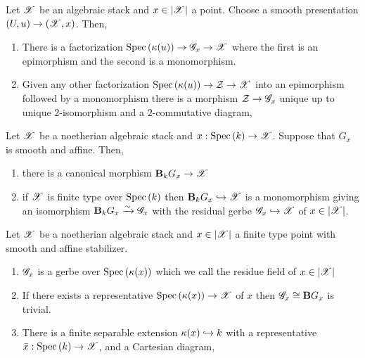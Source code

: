 \documentclass[12pt]{article}
\begin{document}
\begin{prop}
Let $\mathscr{X}$ be an algebraic stack and $x \in |\mathscr{X}|$ a point. Choose a smooth presentation $(U, u) \to (\mathscr{X}, x)$. Then,
\begin{enumerate}
\item There is a factorization $\mathrm{Spec}\left( \kappa(u) \right) \to \mathscr{G}_x \to \mathscr{X}$ where the first is an epimorphism and the second is a monomorphism.
\item Given any other factorization $\mathrm{Spec}\left( \kappa(u) \right) \to \mathcal{Z} \to \mathscr{X}$ into an epimorphism followed by a monomorphism there is a morphism $\mathcal{Z} \to \mathscr{G}_x$ unique up to unique $2$-isomorphism and a $2$-commutative diagram,
\begin{center}
\end{center}
\end{enumerate}
\end{prop}

\begin{prop}
Let $\mathscr{X}$ be a noetherian algebraic stack and $x : \mathrm{Spec}\left( k \right) \to \mathscr{X}$. Suppose that $G_x$ is smooth and affine. Then,
\begin{enumerate}
\item there is a canonical morphism $\mathbf{B}_k G_x \to \mathscr{X}$
\item if $\mathscr{X}$ is finite type over $\mathrm{Spec}\left( k \right)$ then $\mathbf{B}_k G_x \hookrightarrow \mathscr{X}$ is a monomorphism giving an isomorphism $\mathbf{B}_k G_x \xrightarrow{\sim} \mathscr{G}_x$ with the residual gerbe $\mathscr{G}_x \hookrightarrow \mathscr{X}$ of $x \in |\mathscr{X}|$.
\end{enumerate}
\end{prop}

\begin{prop}
Let $\mathscr{X}$ be a noetherian algebraic stack and $x \in |\mathscr{X}|$ a finite type point with smooth and affine stabilizer. 
\begin{enumerate}
\item $\mathscr{G}_x$ is a gerbe over $\mathrm{Spec}\left( \kappa(x) \right)$ which we call the residue field of $x \in |\mathscr{X}|$
\item If there exists a representative $\mathrm{Spec}\left( \kappa(x) \right) \to \mathscr{X}$ of $x$ then $\mathscr{G}_x \cong \mathbf{B} G_x$ is trivial.

\item There is a finite separable extension $\kappa(x) \hookrightarrow k$ with a representative $\bar{x} : \mathrm{Spec}\left( k \right) \to \mathscr{X}$, and a Cartesian diagram,
\begin{center}
\end{center}
\end{enumerate}
\end{prop}
\end{document}
